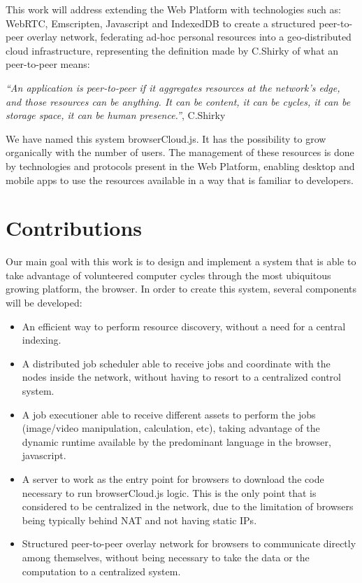 This work will address extending the Web Platform with technologies such as: WebRTC, Emscripten, Javascript and IndexedDB to create a structured peer-to-peer overlay network, federating ad-hoc personal resources into a geo-distributed cloud infrastructure, representing the definition made by C.Shirky of what an peer-to-peer means:

  \textit{``An application is peer-to-peer if it aggregates resources at the network’s edge, and those resources can be anything. It can be content, it can be cycles, it can be storage space, it can be human presence.''}, C.Shirky \cite{Shirky.}

We have named this system browserCloud.js. It has the possibility to grow organically with the number of users. The management of these resources is done by technologies and protocols present in the Web Platform, enabling desktop and mobile apps to use the resources available in a way that is familiar to developers.

\section{Contributions}

Our main goal with this work is to design and implement a system that is able to take advantage of volunteered computer cycles through the most ubiquitous growing platform, the browser. In order to create this system, several components will be developed:

\begin{itemize}
    \item An efficient way to perform resource discovery, without a need for a central indexing.
    \item A distributed job scheduler able to receive jobs and coordinate with the nodes inside the network, without having to resort to a centralized control system.
    \item A job executioner able to receive different assets to perform the jobs (image/video manipulation, calculation, etc), taking advantage of the dynamic runtime available by the predominant language in the browser, javascript.
    \item A server to work as the entry point for browsers to download the code necessary to run browserCloud.js logic. This is the only point that is considered to be centralized in the network, due to the limitation of browsers being typically behind NAT and not having static IPs.
    \item Structured peer-to-peer overlay network for browsers to communicate directly among themselves, without being necessary to take the data or the computation to a centralized system.
\end{itemize}

